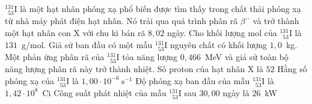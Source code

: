 	\begin{ex}%
		${}^{131}_{\phantom{1}53}\text{I}$ là một hạt nhân phóng xạ phổ biến được tìm thấy trong chất thải phóng xạ từ nhà máy phát điện hạt nhân. Nó trải qua quá trình phân rã $\beta^-$ và trở thành một hạt nhân con X với chu kì bán rã $8{,}02$ ngày. Cho khối lượng mol của ${}^{131}_{\phantom{1}53}\text{I}$ là $131$~g/mol. Giả sử ban đầu có một mẫu ${}^{131}_{\phantom{1}53}\text{I}$ nguyên chất có khối lượng $1{,}0$~kg. Một phản ứng phân rã của ${}^{131}_{\phantom{1}53}\text{I}$ tỏa năng lượng $0{,}466$~MeV và giả sử toàn bộ năng lượng phân rã này trở thành nhiệt.
		\choiceTFt
		{Số proton của hạt nhân X là $52$}
		{\True Hằng số phóng xạ của ${}^{131}_{\phantom{1}53}\text{I}$ là $1{,}00\cdot 10^{-6}~\text{s}^{-1}$}
		{Độ phóng xạ ban đầu của mẫu ${}^{131}_{\phantom{1}53}\text{I}$ là $1{,}42\cdot 10^{8}$~Ci}
		{\True Công suất phát nhiệt của mẫu ${}^{131}_{\phantom{1}53}\text{I}$ sau $30{,}00$ ngày là $26$~kW}
	\end{ex}


